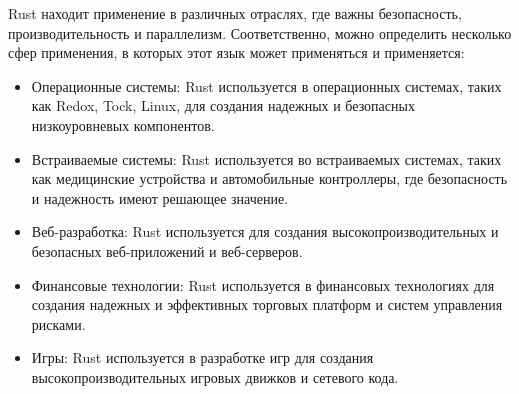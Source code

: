 Rust находит применение в различных отраслях, где важны безопасность, производительность и параллелизм. Соответственно, можно определить несколько сфер применения, в которых этот язык может применяться и применяется:
\begin{itemize}
    \item Операционные системы: Rust используется в операционных системах, таких как Redox, Tock, Linux, для создания надежных и безопасных низкоуровневых компонентов.
    \item Встраиваемые системы: Rust используется во встраиваемых системах, таких как медицинские устройства и автомобильные контроллеры, где безопасность и надежность имеют решающее значение.
    \item Веб-разработка: Rust используется для создания высокопроизводительных и безопасных веб-приложений и веб-серверов.
    \item Финансовые технологии: Rust используется в финансовых технологиях для создания надежных и эффективных торговых платформ и систем управления рисками.
    \item Игры: Rust используется в разработке игр для создания высокопроизводительных игровых движков и сетевого кода.
\end{itemize}

